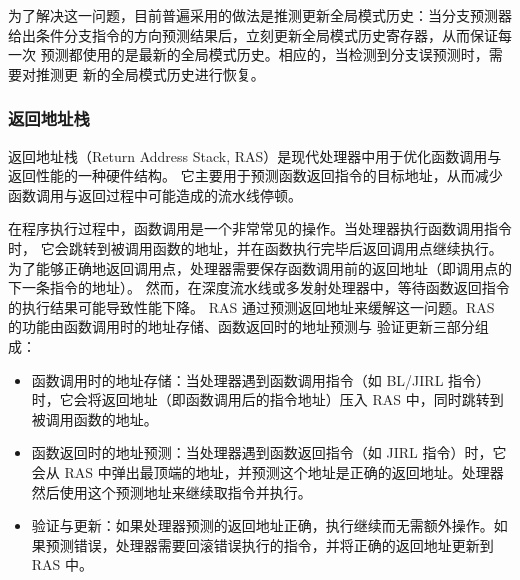 为了解决这一问题，目前普遍采用的做法是推测更新全局模式历史：当分支预测器
给出条件分支指令的方向预测结果后，立刻更新全局模式历史寄存器，从而保证每一次
预测都使用的是最新的全局模式历史。相应的，当检测到分支误预测时，需要对推测更
新的全局模式历史进行恢复。

\subsubsection{返回地址栈}\label{sec:11-advanced-cpu-024}

返回地址栈（Return Address Stack, RAS）是现代处理器中用于优化函数调用与返回性能的一种硬件结构。
它主要用于预测函数返回指令的目标地址，从而减少函数调用与返回过程中可能造成的流水线停顿。

在程序执行过程中，函数调用是一个非常常见的操作。当处理器执行函数调用指令时，
它会跳转到被调用函数的地址，并在函数执行完毕后返回调用点继续执行。
为了能够正确地返回调用点，处理器需要保存函数调用前的返回地址（即调用点的下一条指令的地址）。
然而，在深度流水线或多发射处理器中，等待函数返回指令的执行结果可能导致性能下降。
RAS 通过预测返回地址来缓解这一问题。RAS 的功能由函数调用时的地址存储、函数返回时的地址预测与
验证更新三部分组成：

\begin{itemize}
\tightlist
\item
  函数调用时的地址存储：当处理器遇到函数调用指令（如 BL/JIRL 指令）时，它会将返回地址（即函数调用后的指令地址）压入 RAS 中，同时跳转到被调用函数的地址。
\item
  函数返回时的地址预测：当处理器遇到函数返回指令（如 JIRL 指令）时，它会从 RAS 中弹出最顶端的地址，并预测这个地址是正确的返回地址。处理器然后使用这个预测地址来继续取指令并执行。
\item
  验证与更新：如果处理器预测的返回地址正确，执行继续而无需额外操作。如果预测错误，处理器需要回滚错误执行的指令，并将正确的返回地址更新到 RAS 中。
\end{itemize}
